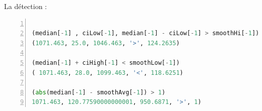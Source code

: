La détection :

\begin{lstlisting}[language=python,numbers=left,
frame=single,
showstringspaces=true,
basicstyle=\footnotesize,
keywordstyle=\color{blue}\ttfamily\textbf,
identifierstyle=\color{magenta}\ttfamily,
stringstyle=\color{red}\ttfamily,
commentstyle=\color{cyan}\ttfamily\textit
]

(median[-1] , ciLow[-1], median[-1] - ciLow[-1] > smoothHi[-1])
(1071.463, 25.0, 1046.463, '>', 124.2635)

(median[-1] + ciHigh[-1] < smoothLow[-1])
( 1071.463, 28.0, 1099.463, '<', 118.6251)

(abs(median[-1] - smoothAvg[-1]) > 1)
1071.463, 120.77590000000001, 950.6871, '>', 1)
\end{lstlisting}


